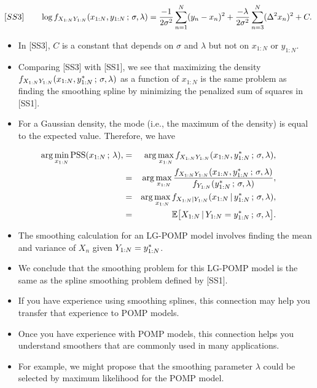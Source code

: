 \documentclass[]{article}
\begin{document}
$$[SS3]
\quad\quad \displaystyle  \log f_{X_{1:N}Y_{1:N}}(x_{1:N},y_{1:N} \, ; \, \sigma,\lambda) = \frac{-1}{2\sigma^2} \sum_{n=1}^N(y_n-x_n)^2 +\frac{-\lambda}{2\sigma^2} \sum_{n=3}^N(\Delta^2 x_n)^2 + C.$$

\begin{itemize}
\item
  In {[}SS3{]}, \(C\) is a constant that depends on \(\sigma\) and
  \(\lambda\) but not on \(x_{1:N}\) or \(y_{1:N}\).
\item
  Comparing {[}SS3{]} with {[}SS1{]}, we see that maximizing the density
  \(f_{X_{1:N}Y_{1:N}}(x_{1:N},y_{1:N}^* \, ; \, \sigma,\lambda)\)
  as a function of \(x_{1:N}\) is the same problem as finding the
  smoothing spline by minimizing the penalized sum of squares in
  {[}SS1{]}.
\item
  For a Gaussian density, the mode (i.e., the maximum of the density) is
  equal to the expected value. Therefore, we have
\end{itemize}

\begin{eqnarray}
\arg\min_{x_{1:N}} \mathrm{PSS}(x_{1:N}\, ; \,\lambda),
&=& 
\arg\max_{x_{1:N}} f_{X_{1:N}Y_{1:N}}(x_{1:N},y_{1:N}^*\, ; \, \sigma,\lambda),
\\
&=&
\arg\max_{x_{1:N}} \frac{
  f_{X_{1:N}Y_{1:N}}(x_{1:N},y_{1:N}^* \, ; \, \sigma,\lambda)
}{
  f_{Y_{1:N}}(y_{1:N}^* \, ; \, \sigma,\lambda)
},
\\
&=& 
\arg\max_{x_{1:N}} f_{X_{1:N}|Y_{1:N}}(x_{1:N}{\, | \,} y_{1:N}^*\, ; \, \sigma,\lambda),
\\
&=& \mathbb{E}\big[X_{1:N}{\, | \,} Y_{1:N}=y_{1:N}^* \, ; \,  \sigma,\lambda\big].
\end{eqnarray}

\begin{itemize}
\item
  The smoothing calculation for an LG-POMP model involves finding the
  mean and variance of \(X_{n}\) given \(Y_{1:N}=y_{1:N}^*\).
\item
  We conclude that the smoothing problem for this LG-POMP model is the
  same as the spline smoothing problem defined by {[}SS1{]}.
\item
  If you have experience using smoothing splines, this connection may
  help you transfer that experience to POMP models.
\item
  Once you have experience with POMP models, this connection helps you
  understand smoothers that are commonly used in many applications.
\item
  For example, we might propose that the smoothing parameter \(\lambda\)
  could be selected by maximum likelihood for the POMP model.
\end{itemize}
\end{document}
